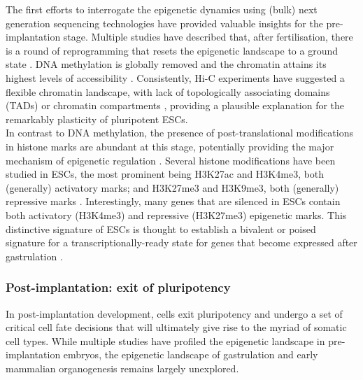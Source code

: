 The first efforts to interrogate the epigenetic dynamics using (bulk) next generation sequencing technologies have provided valuable insights for the pre-implantation stage. Multiple studies have described that, after fertilisation, there is a round of reprogramming that resets the epigenetic landscape to a ground state \cite{Smith2012,Lee2014}. DNA methylation is globally removed and the chromatin attains its highest levels of accessibility \cite{Wu2016}. Consistently, Hi-C experiments have suggested a flexible chromatin landscape, with lack of topologically associating domains (TADs) or chromatin compartments \cite{Ke2017,Du2017,Tee2014}, providing a plausible explanation for the remarkably plasticity of pluripotent ESCs.\\
In contrast to DNA methylation, the presence of post-translational modifications in histone marks are abundant at this stage, potentially providing the major mechanism of epigenetic regulation \cite{Hanna2018,Tee2014}. Several histone modifications have been studied in ESCs, the most prominent being H3K27ac and H3K4me3, both (generally) activatory marks; and H3K27me3 and H3K9me3, both (generally) repressive marks \cite{Zhao2015}. Interestingly, many genes that are silenced in ESCs contain both activatory (H3K4me3) and repressive (H3K27me3) epigenetic marks. This distinctive signature of ESCs is thought to establish a bivalent or poised signature for a transcriptionally-ready state for genes that become expressed after gastrulation \cite{Bernstein2006,Tee2014}. 

\subsubsection{Post-implantation: exit of pluripotency}

In post-implantation development, cells exit pluripotency and undergo a set of critical cell fate decisions that will ultimately give rise to the myriad of somatic cell types. While multiple studies have profiled the epigenetic landscape in pre-implantation embryos, the epigenetic landscape of gastrulation and early mammalian organogenesis remains largely unexplored.


